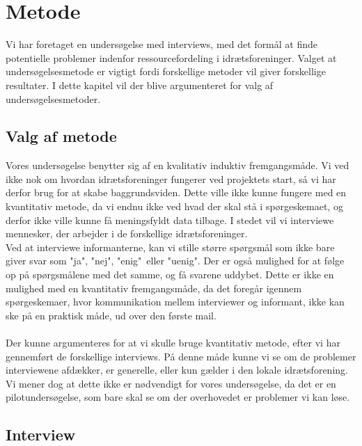 \chapter{Metode}\label{ch:ch2label}
Vi har foretaget en undersøgelse med interviews, med det formål at finde potentielle problemer indenfor ressourcefordeling i idrætsforeninger. Valget at undersøgelsesmetode er vigtigt fordi forskellige metoder vil giver forskellige resultater. I dette kapitel vil der blive argumenteret for valg af undersøgelsesmetoder.


\section{Valg af metode}
Vores undersøgelse benytter sig af en kvalitativ induktiv fremgangsmåde. Vi ved ikke nok om hvordan idrætsforeninger fungerer ved projektets start, så vi har derfor brug for at skabe baggrundsviden. Dette ville ikke kunne fungere med en kvantitativ metode, da vi endnu ikke ved hvad der skal stå i spørgeskemaet, og derfor ikke ville kunne få meningsfyldt data tilbage. I stedet vil vi interviewe mennesker, der arbejder i de forskellige idrætsforeninger.\\ 
Ved at interviewe informanterne, kan vi stille større spørgsmål som ikke bare giver svar som "ja", "nej", "enig"\ eller "uenig". Der er også mulighed for at følge op på spørgsmålene med det samme, og få svarene uddybet. Dette er ikke en mulighed med en kvantitativ fremgangsmåde, da det foregår igennem spørgeskemaer, hvor kommunikation mellem interviewer og informant, ikke kan ske på en praktisk måde, ud over den første mail.\\
\\
Der kunne argumenteres for at vi skulle bruge kvantitativ metode, efter vi har gennemført de forskellige interviews. På denne måde kunne vi se om de problemer interviewene afdækker, er generelle, eller kun gælder i den lokale idrætsforening. Vi mener dog at dette ikke er nødvendigt for vores undersøgelse, da det er en pilotundersøgelse, som bare skal se om der overhovedet er problemer vi kan løse.\\



\section{Interview}

























